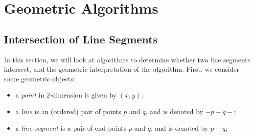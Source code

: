\documentclass[a4paper, openany]{memoir}
\begin{document}
\chapter{Geometric Algorithms}
\section{Intersection of Line Segments}
In this section, we will look at algorithms to determine whether two line segments intersect, and the geometric interpretation of the algorithm. First, we consider some geometric objects:
\begin{itemize}
    \item a \emph{point} in 2-dimension is given by $(x, y)$;
    \item a \emph{line} is an (ordered) pair of points $p$ and $q$, and is denoted by $-p-q-$;
    \item a \emph{line segment} is a pair of end-points $p$ and $q$, and is denoted by $p-q$;
\end{itemize}
\end{document}
